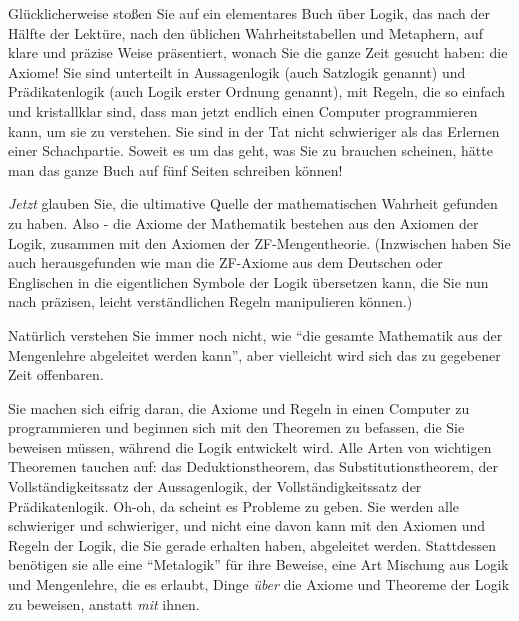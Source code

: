 Glücklicherweise stoßen Sie auf ein elementares Buch über Logik, das nach der Hälfte der Lektüre, nach den üblichen Wahrheitstabellen und Metaphern, auf klare und präzise Weise präsentiert, wonach Sie die ganze Zeit gesucht haben: die Axiome!  Sie sind unterteilt in Aussagenlogik (auch Satzlogik genannt) und Prädikatenlogik (auch Logik erster Ordnung genannt), mit Regeln, die so einfach und kristallklar sind, dass man jetzt endlich einen Computer programmieren kann, um sie zu verstehen.  Sie sind in der Tat nicht schwieriger als das Erlernen einer Schachpartie.
Soweit es um das geht, was Sie zu brauchen scheinen, hätte man das ganze Buch auf fünf Seiten schreiben können!

{\em Jetzt} glauben Sie, die ultimative Quelle der mathematischen Wahrheit gefunden zu haben.  Also - die Axiome der Mathematik bestehen aus den Axiomen der Logik, zusammen mit den Axiomen der ZF-Mengentheorie. (Inzwischen haben Sie auch herausgefunden wie man die ZF-Axiome aus dem Deutschen oder Englischen in die eigentlichen Symbole der Logik übersetzen kann, die Sie nun nach präzisen, leicht verständlichen Regeln manipulieren können.)

Natürlich verstehen Sie immer noch nicht, wie "`die gesamte Mathematik aus der Mengenlehre abgeleitet werden kann"', aber vielleicht wird sich das zu gegebener Zeit offenbaren.
	
Sie machen sich eifrig daran, die Axiome und Regeln in einen Computer zu programmieren und beginnen sich mit den Theoremen zu befassen, die Sie beweisen müssen, während die Logik entwickelt wird.  Alle Arten von wichtigen Theoremen tauchen auf: das Deduktionstheorem, das Substitutionstheorem, der Vollständigkeitssatz der Aussagenlogik, der Vollständigkeitssatz der Prädikatenlogik.
Oh-oh, da scheint es Probleme zu geben.  Sie werden alle schwieriger und schwieriger, und nicht eine davon kann mit den Axiomen und Regeln der Logik, die Sie gerade erhalten haben, abgeleitet werden.  Stattdessen benötigen sie alle eine "`Metalogik"' für ihre Beweise, eine Art Mischung aus Logik und Mengenlehre, die es erlaubt, Dinge {\em über} die Axiome und Theoreme der Logik zu beweisen, anstatt {\em mit} ihnen.

